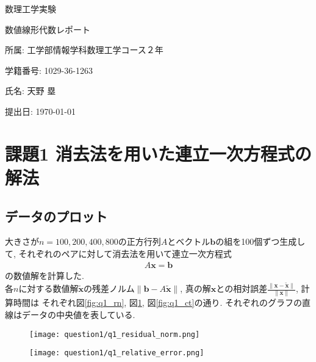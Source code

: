 \documentclass[uplatex,a4j]{jsarticle}
\begin{document}
\begin{titlepage}
    \centering
    \vfill
    
    {\Huge 数理工学実験\par}
    \vspace{1cm}
    
    {\Large 数値線形代数レポート\par}
    
    \vfill
    
    {\Large
    所属: 工学部情報学科数理工学コース２年\par
    学籍番号: 1029-36-1263\par
    氏名: 天野 塁\par
    }
    
    \vfill
    
    {\Large 提出日: \today \par}
    
    \vfill
\end{titlepage}

\section{課題1 消去法を用いた連立一次方程式の解法}
\label{sec:q1}

\subsection{データのプロット}
\label{sec:q1_1}

大きさが$n = 100,200,400,800$の正方行列$A$とベクトル$\bm{b}$の組を100個ずつ生成して, 
それぞれのペアに対して消去法を用いて連立一次方程式
\begin{align}
  A \bm{x} = \bm{b}
\end{align}
の数値解を計算した. \\
各$n$に対する数値解$\bm{\tilde{x}}$の残差ノルム$\| \bm{b} - A \bm{\tilde{x}} \|$, 
真の解$\bm{x}$との相対誤差$\frac{\| \bm{x} - \bm{\tilde{x}} \|}{\| \bm{x} \|}$, 計算時間は
それぞれ図\ref{fig:q1_rn}, 図\ref{fig:q1_re}, 図\ref{fig:q1_ct}の通り. 
それぞれのグラフの直線はデータの中央値を表している.

\begin{figure}[htbp]
  \centering

  \begin{minipage}[t]{0.48\textwidth}
    \centering
    \texttt{[image: question1/q1\_residual\_norm.png]}
    \label{fig:q1_rn}
  \end{minipage}
  \hfill
  \begin{minipage}[t]{0.48\textwidth}
    \centering
    \texttt{[image: question1/q1\_relative\_error.png]}
    \label{fig:q1_re}
  \end{minipage}
  
\end{figure}
\end{document}
